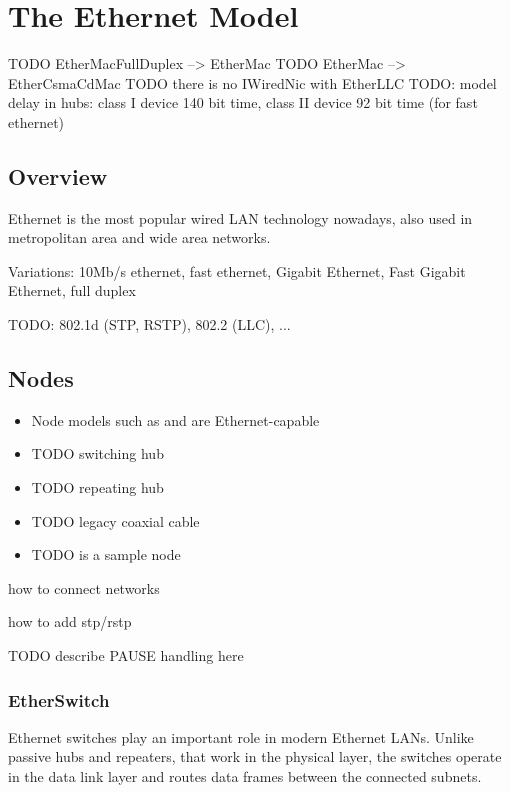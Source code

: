 \chapter{The Ethernet Model}
\label{cha:ethernet}

TODO EtherMacFullDuplex --> EtherMac
TODO EtherMac --> EtherCsmaCdMac
TODO there is no IWiredNic with EtherLLC
TODO: model delay in hubs: class I device 140 bit time, class II device 92 bit time (for fast ethernet)

\section{Overview}

Ethernet is the most popular wired LAN technology nowadays, also used in
metropolitan area and wide area networks.

Variations: 10Mb/s ethernet, fast ethernet, Gigabit Ethernet, Fast Gigabit Ethernet, full duplex

TODO: 802.1d (STP, RSTP), 802.2 (LLC), ...


\section{Nodes}

\begin{itemize}
  \item Node models such as  and  are Ethernet-capable
  \item {} TODO switching hub
  \item {} TODO repeating hub
  \item {} TODO legacy coaxial cable
  \item {} TODO is a sample node
\end{itemize}

how to connect networks

how to add stp/rstp

TODO describe PAUSE handling here

\subsection{EtherSwitch}

Ethernet switches play an important role in modern Ethernet LANs. Unlike
passive hubs and repeaters, that work in the physical layer, the switches
operate in the data link layer and routes data frames between the connected
subnets.

